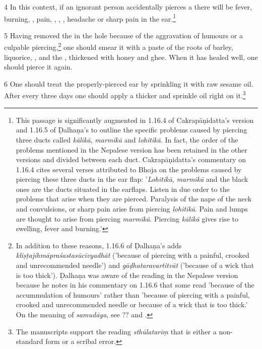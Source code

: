 \begin{translation}
    \item [4] In this context, if an ignorant person accidentally pierces a 
     there will 
    be fever, burning, , pain, , 
    , 
    , headache or sharp pain in the ear.\footnote{This passage is significantly augmented in 1.16.4 of Cakrapāṇidatta's version \citep[126]{acar-1939} and 1.16.5 of Ḍalhaṇa's \citep[77]{vulgate} to outline the specific problems caused by piercing three ducts called \emph{kālikā}, \emph{marmikā} and \emph{lohitikā}. In fact, the order of the problems mentioned in the Nepalese version has been retained in the other versions and divided between each duct. Cakrapāṇidatta's commentary on 1.16.4 \citep[126]{acar-1939} cites several verses attributed to Bhoja on the problems caused by piercing these three ducts in the ear flap: '\emph{Lohitikā}, \emph{marmikā} and the black ones are the ducts situated in the earflaps.  Listen in due order to the problems that arise when they are pierced. Paralysis of the nape of the neck and convulsions, or sharp pain arise from piercing \emph{lohitikā}. Pain and lumps are thought to arise from piercing \emph{marmikā}. Piercing \emph{kālikā} gives rise to swelling, fever and burning.'}
    
    \item[5]     Having removed the  in the hole because of the 
    aggravation of humours or a culpable piercing,\footnote{In addition to these 
    reasons, 1.16.6 of Ḍalhaṇa's \citep[77]{vulgate} adds
    \emph{kliṣṭajihmāpraśastasūcīvyadhāt} ('because of piercing with a painful, 
    crooked and unrecommended needle') and \emph{gāḍhataravartitvāt} 
    ('because of a wick that is too thick'). Ḍalhaṇa was aware of the reading in the 
    Nepalese version because he notes in his commentary on 1.16.6 
    \citep[77]{vulgate} that some read 'because of the accummulation of humours' 
    rather than 'because of piercing with a painful, crooked and unrecommended 
    needle or because of a wick that is too thick.' On the meaning of 
    \emph{samudāya}, see ?? and \cite[1–5]{meul-1992}.} one should smear it with
    a paste of the roots of 
    barley, 
    liquorice, 
    , and the
    ,
    thickened with honey and ghee. When it has healed well, one should pierce it again.
    
    \item[6] One should treat the properly-pierced ear by sprinkling it with raw sesame
    oil.   After every three days one should apply a thicker  and
    sprinkle oil right on it.\footnote{The manuscripts support the reading
    \emph{sthūlatarīṃ} that is either a non-standard form or a scribal error.}
    

\end{translation}
